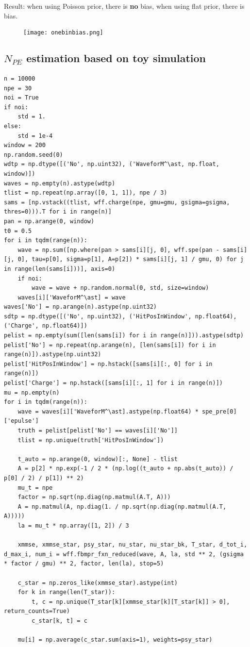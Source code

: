 \documentclass[notitlepage]{article}
\begin{document}
Result: when using Poisson prior, there is \textbf{no} bias, when using flat prior, there is bias. 

\begin{figure}[H]
    \centering
    \texttt{[image: onebinbias.png]}
\end{figure}

\subsection{$N_{PE}$ estimation based on toy simulation}

\begin{lstlisting}
n = 10000
npe = 30
noi = True
if noi:
    std = 1.
else:
    std = 1e-4
window = 200
np.random.seed(0)
wdtp = np.dtype([('No', np.uint32), ('WaveforM^\ast, np.float, window)])
waves = np.empty(n).astype(wdtp)
tlist = np.repeat(np.array([0, 1, 1]), npe / 3)
sams = [np.vstack((tlist, wff.charge(npe, gmu=gmu, gsigma=gsigma, thres=0))).T for i in range(n)]
pan = np.arange(0, window)
t0 = 0.5
for i in tqdm(range(n)):
    wave = np.sum([np.where(pan > sams[i][j, 0], wff.spe(pan - sams[i][j, 0], tau=p[0], sigma=p[1], A=p[2]) * sams[i][j, 1] / gmu, 0) for j in range(len(sams[i]))], axis=0)
    if noi:
        wave = wave + np.random.normal(0, std, size=window)
    waves[i]['WaveforM^\ast] = wave
waves['No'] = np.arange(n).astype(np.uint32)
sdtp = np.dtype([('No', np.uint32), ('HitPosInWindow', np.float64), ('Charge', np.float64)])
pelist = np.empty(sum([len(sams[i]) for i in range(n)])).astype(sdtp)
pelist['No'] = np.repeat(np.arange(n), [len(sams[i]) for i in range(n)]).astype(np.uint32)
pelist['HitPosInWindow'] = np.hstack([sams[i][:, 0] for i in range(n)])
pelist['Charge'] = np.hstack([sams[i][:, 1] for i in range(n)])
mu = np.empty(n)
for i in tqdm(range(n)):
    wave = waves[i]['WaveforM^\ast].astype(np.float64) * spe_pre[0]['epulse']
    truth = pelist[pelist['No'] == waves[i]['No']]
    tlist = np.unique(truth['HitPosInWindow'])

    t_auto = np.arange(0, window)[:, None] - tlist
    A = p[2] * np.exp(-1 / 2 * (np.log((t_auto + np.abs(t_auto)) / p[0] / 2) / p[1]) ** 2)
    mu_t = npe
    factor = np.sqrt(np.diag(np.matmul(A.T, A)))
    A = np.matmul(A, np.diag(1. / np.sqrt(np.diag(np.matmul(A.T, A)))))
    la = mu_t * np.array([1, 2]) / 3
    
    xmmse, xmmse_star, psy_star, nu_star, nu_star_bk, T_star, d_tot_i, d_max_i, num_i = wff.fbmpr_fxn_reduced(wave, A, la, std ** 2, (gsigma * factor / gmu) ** 2, factor, len(la), stop=5)
    
    c_star = np.zeros_like(xmmse_star).astype(int)
    for k in range(len(T_star)):
        t, c = np.unique(T_star[k][xmmse_star[k][T_star[k]] > 0], return_counts=True)
        c_star[k, t] = c

    mu[i] = np.average(c_star.sum(axis=1), weights=psy_star)
\end{lstlisting}
\end{document}

